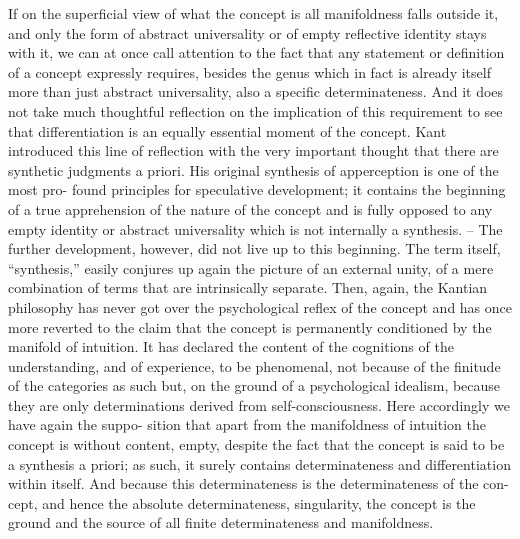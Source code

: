 If on the superficial view of what the concept is all manifoldness falls
outside it, and only the form of abstract universality or of empty reflective
identity stays with it, we can at once call attention to the fact that any
statement or definition of a concept expressly requires, besides the genus
which in fact is already itself more than just abstract universality, also a
specific determinateness. And it does not take much thoughtful reflection on
the implication of this requirement to see that differentiation is an equally
essential moment of the concept. Kant introduced this line of reflection
with the very important thought that there are synthetic judgments
a priori. His original synthesis of apperception is one of the most pro-
found principles for speculative development; it contains the beginning of
a true apprehension of the nature of the concept and is fully opposed to any
empty identity or abstract universality which is not internally a synthesis. –
The further development, however, did not live up to this beginning. The
term itself, “synthesis,” easily conjures up again the picture of an external
unity, of a mere combination of terms that are intrinsically separate. Then,
again, the Kantian philosophy has never got over the psychological reflex
of the concept and has once more reverted to the claim that the concept is
permanently conditioned by the manifold of intuition. It has declared the
content of the cognitions of the understanding, and of experience, to be
phenomenal, not because of the finitude of the categories as such but, on the
ground of a psychological idealism, because they are only determinations
derived from self-consciousness. Here accordingly we have again the suppo-
sition that apart from the manifoldness of intuition the concept is without
content, empty, despite the fact that the concept is said to be a synthesis a
priori; as such, it surely contains determinateness and differentiation within
itself. And because this determinateness is the determinateness of the con-
cept, and hence the absolute determinateness, singularity, the concept is the
ground and the source of all finite determinateness and manifoldness.

